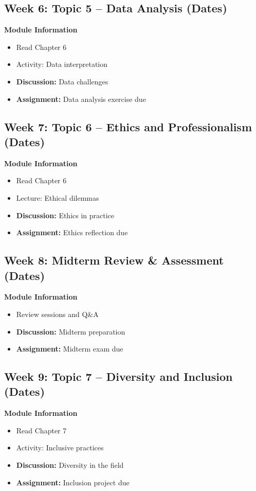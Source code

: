 \documentclass[12pt]{article}
\begin{document}
\subsection*{Week 6: Topic 5 -- Data Analysis (Dates)}
\textbf{Module Information}
\begin{itemize}
\item Read Chapter 6
\item Activity: Data interpretation
\item \textbf{Discussion:} Data challenges
\item \textbf{Assignment:} Data analysis exercise due
\end{itemize}

\subsection*{Week 7: Topic 6 -- Ethics and Professionalism (Dates)}
\textbf{Module Information}
\begin{itemize}
\item Read Chapter 6
\item Lecture: Ethical dilemmas
\item \textbf{Discussion:} Ethics in practice
\item \textbf{Assignment:} Ethics reflection due
\end{itemize}

\subsection*{Week 8: Midterm Review \& Assessment (Dates)}
\textbf{Module Information}
\begin{itemize}
\item Review sessions and Q\&A
\item \textbf{Discussion:} Midterm preparation
\item \textbf{Assignment:} Midterm exam due
\end{itemize}

\subsection*{Week 9: Topic 7 -- Diversity and Inclusion (Dates)}
\textbf{Module Information}
\begin{itemize}
\item Read Chapter 7
\item Activity: Inclusive practices
\item \textbf{Discussion:} Diversity in the field
\item \textbf{Assignment:} Inclusion project due
\end{itemize}
\end{document}
